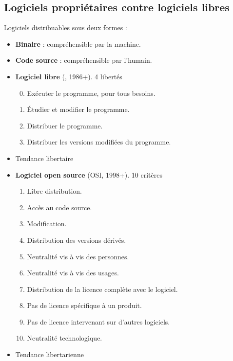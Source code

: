 \subsection{Logiciels propriétaires contre logiciels libres} %

\begin{slide}
	Logiciels distribuables sous deux formes :
	\begin{itemize}
		\item \textbf{Binaire} : compréhensible par la machine.
		\item \textbf{Code source} : compréhensible par l'humain.
	\end{itemize}

\end{slide}

\begin{slide}
	\begin{itemize}
		\item \textbf{Logiciel libre} (, 1986+). 4 libertés
		\begin{enumerate}
		\setcounter{enumi}{-1}
			\item Exécuter le programme, pour tous besoins.
			\item Étudier et modifier le programme.
			\item Distribuer le programme.
			\item Distribuer les versions modifiées du programme.
		\end{enumerate}
		\item Tendance libertaire
	\end{itemize}

\end{slide} 

\begin{slide}
	\begin{itemize}
		\item \textbf{Logiciel open source} (OSI, 1998+). 10 critères
			\begin{enumerate}
				\item Libre distribution.
				\item Accès au code source.
				\item Modification.
				\item Distribution des versions dérivés.
				\item Neutralité vis à vis des  personnes.
				\item Neutralité vis à vis des usages.
				\item Distribution de la licence complète avec le logiciel.
				\item Pas de licence spécifique à un produit.
				\item Pas de licence intervenant sur d'autres logiciels.
				\item Neutralité technologique.
			\end{enumerate}
		\item Tendance libertarienne
	\end{itemize}
\end{slide}

